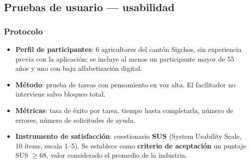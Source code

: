 \documentclass[12pt,a4paper]{article}
\begin{document}
\subsection{Pruebas de usuario --- usabilidad}

\subsubsection{Protocolo}

\begin{itemize}
  \item \textbf{Perfil de participantes}: 6 agricultores del cantón Sigchos, sin
        experiencia previa con la aplicación; se incluye al menos un participante
        mayor de 55 años y uno con baja alfabetización digital.
  \item \textbf{Método}: prueba de tareas con pensamiento en voz alta. El
        facilitador no interviene salvo bloqueo total.
  \item \textbf{Métricas}: tasa de éxito por tarea, tiempo hasta completarla,
        número de errores, número de solicitudes de ayuda.
  \item \textbf{Instrumento de satisfacción}: cuestionario \textbf{SUS} (System
        Usability Scale, 10 ítems, escala 1--5). Se establece como
        \textbf{criterio de aceptación} un puntaje SUS $\geq 68$, valor
        considerado el promedio de la industria.
\end{itemize}
\end{document}
